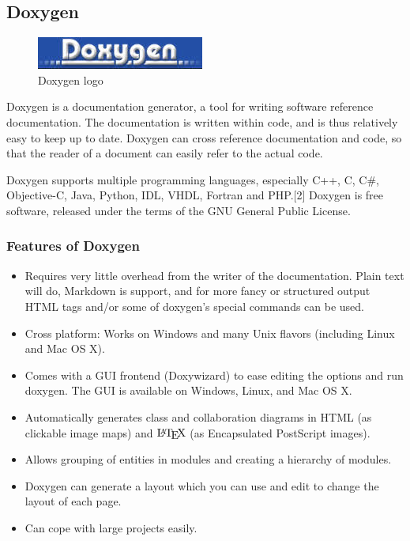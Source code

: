 \subsection{Doxygen}

\begin{figure}[h]
\centering \includegraphics[scale=1]{images/doxygen.jpg}
\caption{Doxygen logo}
\end{figure}
\noindent Doxygen is a documentation generator, a tool for writing software reference 
documentation. The documentation is written within code, and is thus 
relatively easy to keep up to date. Doxygen can cross reference 
documentation and code, so that the reader of a document can easily 
refer to the actual code.

Doxygen supports multiple programming languages, especially C++, C, 
C\#, Objective-C, Java, Python, IDL, VHDL, Fortran and PHP.[2] Doxygen
 is free software, released under the terms of the GNU General Public 
License.\\

\subsubsection{Features of Doxygen}
\begin{itemize}
\item Requires very little overhead from the writer of the documentation. 
Plain text will do, Markdown is support, and for more fancy or structured 
output HTML tags and/or some of doxygen's special commands can be used.
\item Cross platform: Works on Windows and many Unix flavors (including 
Linux and Mac OS X).
\item Comes with a GUI frontend (Doxywizard) to ease editing the options 
and run doxygen. The GUI is available on Windows, Linux, and Mac OS X.
\item Automatically generates class and collaboration diagrams in HTML 
(as clickable image maps) and $\mbox{\LaTeX}$ (as Encapsulated PostScript 
images).
\item Allows grouping of entities in modules and creating a hierarchy 
of modules.
\item Doxygen can generate a layout which you can use and edit to change 
the layout of each page.
\item Can cope with large projects easily.
\end{itemize}


